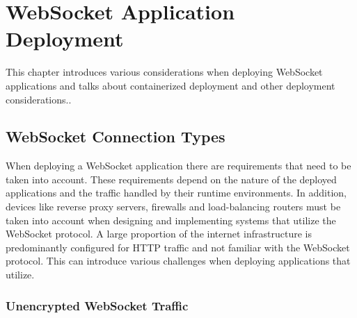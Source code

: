 \chapter{WebSocket Application Deployment}
\label{chapter:webSocketApplicationDeployment}

This chapter introduces various considerations when deploying WebSocket applications and talks about containerized deployment and other deployment considerations..

\section{WebSocket Connection Types}

When deploying a WebSocket application there are requirements that need to be taken into account. These requirements depend on the nature of the deployed applications and the traffic handled by their runtime environments. In addition, devices like reverse proxy servers, firewalls and load-balancing routers must be taken into account when designing and implementing systems that utilize the WebSocket protocol. A large proportion of the internet infrastructure is predominantly configured for HTTP traffic and not familiar with the WebSocket protocol. This can introduce various challenges when deploying applications that utilize.

\subsection{Unencrypted WebSocket Traffic}

